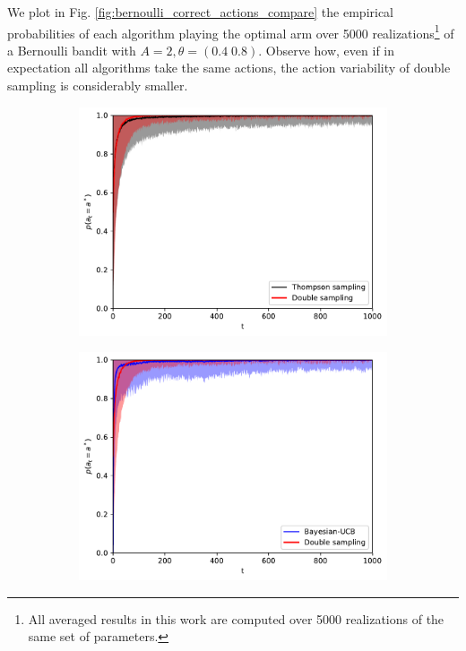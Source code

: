 \documentclass{article}
\begin{document}
We plot in Fig. \ref{fig:bernoulli_correct_actions_compare} the empirical probabilities of each algorithm playing the optimal arm over 5000 realizations\footnote{All averaged results in this work are computed over 5000 realizations of the same set of parameters.} of a Bernoulli bandit with $A=2, \theta=\left(0.4 \; 0.8\right)$. Observe how, even if in expectation all algorithms take the same actions, the action variability of double sampling is considerably smaller.
\begin{figure}[!h]
	\centering
	\begin{subfigure}[b]{0.49\textwidth}
		\includegraphics[width=\textwidth]{./figs/bernoulli/correct_actions_TS_DS.pdf}
		\label{fig:bernoulli_correct_actions_TS_DS}
	\end{subfigure}%
	\begin{subfigure}[b]{0.49\textwidth}
		\includegraphics[width=\textwidth]{./figs/bernoulli/correct_actions_BUCB_DS.pdf}

\end{subfigure}
\end{figure}
\end{document}
